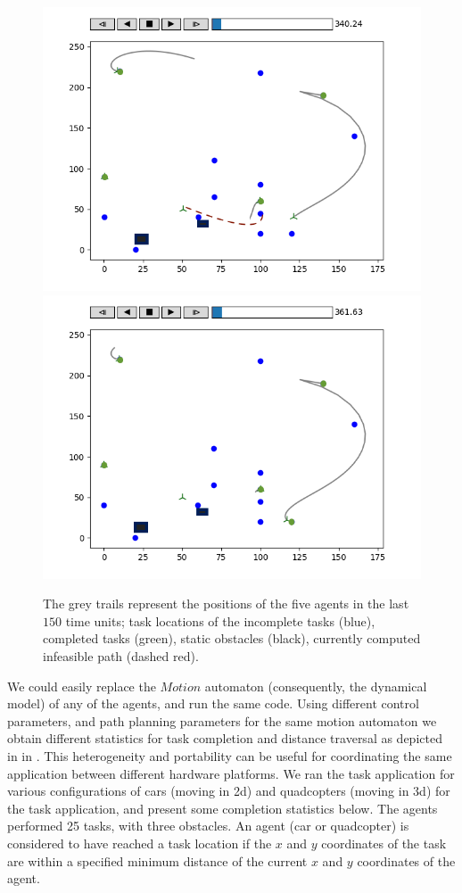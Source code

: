 \begin{figure}[h!]
\begin{minipage}{0.5\textwidth}
\includegraphics[width=.5\textwidth]{figs/task2.png}\hfill
\includegraphics[width=.5\textwidth]{figs/task1.png}\hfill%
\end{minipage}%
\caption{\small The grey trails represent the positions of the five agents in the last $150$ time units; task locations of the incomplete tasks (blue), completed tasks (green), static obstacles (black), currently computed infeasible path (dashed red).}
\label{fig:taskplots}
\end{figure}

We could  easily replace the $\mathit{Motion}$ automaton (consequently, the dynamical model) of any of the agents, and run the same code. Using different control parameters, and path planning parameters for the same motion automaton we obtain different statistics for task completion and distance traversal as depicted in in . This heterogeneity and portability can be useful for coordinating the same application between different hardware platforms. We ran the task application for various configurations of cars (moving in 2d) and quadcopters (moving in 3d) for the task application, and present some completion statistics below. The agents performed 25 tasks, with three obstacles. An agent (car or quadcopter) is considered to have reached a task location if the $x$ and $y$ coordinates of the task are within a specified minimum distance of the current $x$ and $y$ coordinates of the agent.
 
